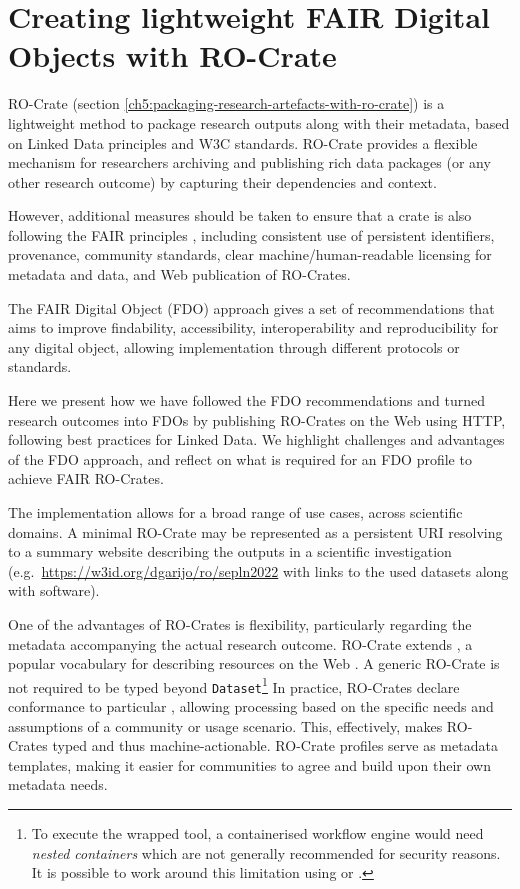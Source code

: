\section{Creating lightweight FAIR Digital Objects with RO-Crate}
\label{ch4:lightweight-fdo}

RO-Crate \cite{Soiland-Reyes 2022a} (section \ref{ch5:packaging-research-artefacts-with-ro-crate}) 
is a lightweight method to package research outputs along with
their metadata, based on Linked Data principles
\cite{Bizer 2009} and
W3C standards. RO-Crate provides a flexible mechanism for researchers
archiving and publishing rich data packages (or any other research
outcome) by capturing their dependencies and context.

However, additional measures should be taken to ensure that a crate is
also following the FAIR principles
\cite{Wilkinson 2016},
including consistent use of persistent identifiers, provenance,
community standards, clear machine/human-readable licensing for metadata
and data, and Web publication of RO-Crates.

The FAIR Digital Object (FDO) approach
\cite{De Smedt 2020}
gives a set of recommendations that aims to improve findability,
accessibility, interoperability and reproducibility for any digital
object, allowing implementation through different protocols or
standards.

Here we present how we have followed the FDO recommendations and turned
research outcomes into FDOs by publishing RO-Crates on the Web using
HTTP, following best practices for Linked Data. We highlight challenges
and advantages of the FDO approach, and reflect on what is required for
an FDO profile to achieve FAIR RO-Crates.

The implementation allows for a broad range of use cases, across
scientific domains. A minimal RO-Crate may be represented as a
persistent URI resolving to a summary website describing the outputs in
a scientific investigation
(e.g.~\url{https://w3id.org/dgarijo/ro/sepln2022} with links to the used
datasets along with software).

One of the advantages of RO-Crates is flexibility, particularly
regarding the metadata accompanying the actual research outcome.
RO-Crate extends \cite{schema.org}, a popular
vocabulary for describing resources on the Web
\cite{Guha 2016}. A generic
RO-Crate is not required to be typed beyond \texttt{Dataset}\footnote{To
  execute the wrapped tool, a containerised workflow engine would need
  \emph{nested containers} which are not generally recommended for
  security reasons. It is possible to work around this limitation using
   or
  .}
In practice, RO-Crates declare conformance to particular
,
allowing processing based on the specific needs and assumptions of a
community or usage scenario. This, effectively, makes RO-Crates typed
and thus machine-actionable. RO-Crate profiles serve as metadata
templates, making it easier for communities to agree and build upon
their own metadata needs.

